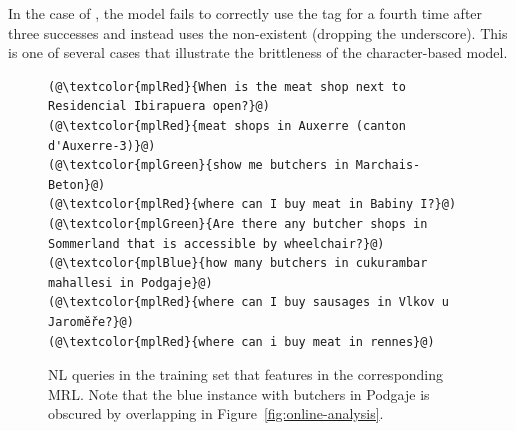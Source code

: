 In the case of , the model fails to correctly use
the tag for a fourth time after three successes and instead uses the
non-existent  (dropping the underscore). This is one
of several cases that illustrate the brittleness of the character-based model.

\begin{figure}[h]
  \centering
  \begin{lstlisting}[style=MyNL]
(@\textcolor{mplRed}{When is the meat shop next to Residencial Ibirapuera open?}@)
(@\textcolor{mplRed}{meat shops in Auxerre (canton d'Auxerre-3)}@)
(@\textcolor{mplGreen}{show me butchers in Marchais-Beton}@)
(@\textcolor{mplRed}{where can I buy meat in Babiny I?}@)
(@\textcolor{mplGreen}{Are there any butcher shops in Sommerland that is accessible by wheelchair?}@)
(@\textcolor{mplBlue}{how many butchers in cukurambar mahallesi in Podgaje}@)
(@\textcolor{mplRed}{where can I buy sausages in Vlkov u Jaroměře?}@)
(@\textcolor{mplRed}{where can i buy meat in rennes}@)
  \end{lstlisting}
  \caption[NL queries for butchers]{NL queries in the \nlmfour{} training set
    that features  in the corresponding MRL. Note that the
    blue instance with butchers in Podgaje is obscured by overlapping in
    Figure~\ref{fig:online-analysis}.}
  \label{fig:butcher-nl}
\end{figure}

